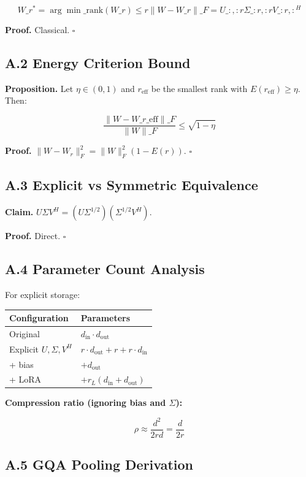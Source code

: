 \[
W\_r^* = \arg\min\_{\text{rank}(W\_r) \leq r} \|W - W\_r\|\_F = U\_{:, :r} \Sigma\_{:r, :r} V\_{:r, :}^H
\tag{A.1}
\]

\textbf{Proof.} Classical. $\square$

\subsection{A.2 Energy Criterion Bound}

\textbf{Proposition.} Let $\eta \in (0, 1)$ and $r_\text{eff}$ be the smallest 
rank with $E(r_\text{eff}) \geq \eta$. Then:

\[
\frac{\|W - W\_{r\_\text{eff}}\|\_F}{\|W\|\_F} \leq \sqrt{1 - \eta}
\tag{A.2}
\]

\textbf{Proof.} $\|W - W_r\|_F^2 = \|W\|_F^2 (1 - E(r))$. $\square$

\subsection{A.3 Explicit vs Symmetric Equivalence}

\textbf{Claim.} $U \Sigma V^H = (U \Sigma^{1/2}) (\Sigma^{1/2} V^H)$.

\textbf{Proof.} Direct. $\square$

\subsection{A.4 Parameter Count Analysis}

For explicit storage:

\begin{table}[H]
\centering
\small
\begin{tabular}{ll}
\toprule
\textbf{Configuration} & \textbf{Parameters} \\
\midrule
Original & $d_\text{in} \cdot d_\text{out}$ \\
Explicit $U, \Sigma, V^H$ & $r \cdot d_\text{out} + r + r \cdot d_\text{in}$ \\
+ bias & $+ d_\text{out}$ \\
+ LoRA & $+ r_L(d_\text{in} + d_\text{out})$ \\
\bottomrule
\end{tabular}
\end{table}

\textbf{Compression ratio (ignoring bias and $\Sigma$):}

\[
\rho \approx \frac{d^2}{2rd} = \frac{d}{2r}
\tag{A.3}
\]

\subsection{A.5 GQA Pooling Derivation}

